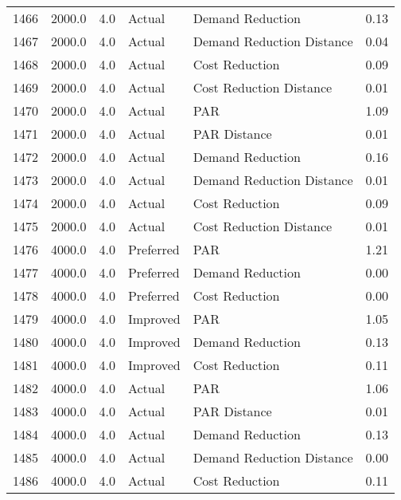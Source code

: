 \begin{longtable}{lrrllr}
1466 &       2000.0 &     4.0 &         Actual &           Demand Reduction &   0.13 \\
1467 &       2000.0 &     4.0 &         Actual &  Demand Reduction Distance &   0.04 \\
1468 &       2000.0 &     4.0 &         Actual &             Cost Reduction &   0.09 \\
1469 &       2000.0 &     4.0 &         Actual &    Cost Reduction Distance &   0.01 \\
1470 &       2000.0 &     4.0 &         Actual &                        PAR &   1.09 \\
1471 &       2000.0 &     4.0 &         Actual &               PAR Distance &   0.01 \\
1472 &       2000.0 &     4.0 &         Actual &           Demand Reduction &   0.16 \\
1473 &       2000.0 &     4.0 &         Actual &  Demand Reduction Distance &   0.01 \\
1474 &       2000.0 &     4.0 &         Actual &             Cost Reduction &   0.09 \\
1475 &       2000.0 &     4.0 &         Actual &    Cost Reduction Distance &   0.01 \\
1476 &       4000.0 &     4.0 &      Preferred &                        PAR &   1.21 \\
1477 &       4000.0 &     4.0 &      Preferred &           Demand Reduction &   0.00 \\
1478 &       4000.0 &     4.0 &      Preferred &             Cost Reduction &   0.00 \\
1479 &       4000.0 &     4.0 &       Improved &                        PAR &   1.05 \\
1480 &       4000.0 &     4.0 &       Improved &           Demand Reduction &   0.13 \\
1481 &       4000.0 &     4.0 &       Improved &             Cost Reduction &   0.11 \\
1482 &       4000.0 &     4.0 &         Actual &                        PAR &   1.06 \\
1483 &       4000.0 &     4.0 &         Actual &               PAR Distance &   0.01 \\
1484 &       4000.0 &     4.0 &         Actual &           Demand Reduction &   0.13 \\
1485 &       4000.0 &     4.0 &         Actual &  Demand Reduction Distance &   0.00 \\
1486 &       4000.0 &     4.0 &         Actual &             Cost Reduction &   0.11 \\

\end{longtable}
